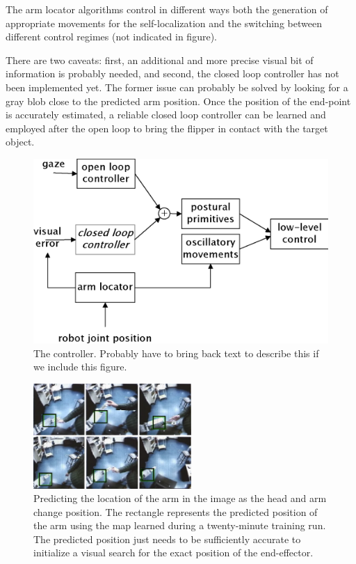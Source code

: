 The arm locator algorithms control in different ways both the
generation of appropriate movements for the self-localization and the
switching between different control regimes (not indicated in figure).

There are two caveats: first, an additional and more precise visual
bit of information is probably needed, and second, the closed loop
controller has not been implemented yet. The former issue can probably
be solved by looking for a gray blob close to the predicted arm
position. Once the position of the end-point is accurately estimated,
a reliable closed loop controller can be learned and employed after the
open loop to bring the flipper in contact with the target object.
\fi

\ifverbose
\begin{figure}[tbh]
\begin{center}
\includegraphics[width=\columnwidth]{control-flow.eps}
\caption{ 
\label{fig:control-flow}
%
  The controller.  Probably have to bring back text to describe this
  if we include this figure.
%
}
\end{center}
\end{figure}
\fi

\begin{figure}[tb]
\begin{center}
\includegraphics[width=6.0cm]{predict-position.eps}
\caption{ 
\label{fig:predict-position}
%
Predicting the location of the arm in the image as the head and arm
change position. The rectangle represents the predicted position of
the arm using the map learned during a twenty-minute training run.
The predicted position just needs to be sufficiently accurate to
initialize a visual search for the exact position of the end-effector.
%
}
\end{center}
\end{figure}

